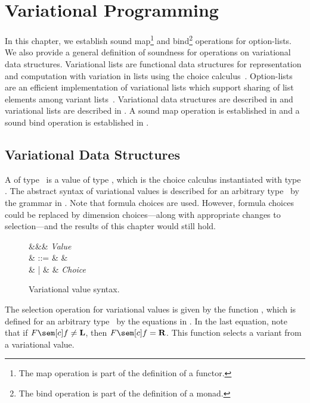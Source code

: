 \chapter{Variational Programming}
\label{ch:vp}

In this chapter, we establish sound map\footnote{The map operation is part of the definition of a functor.} and bind\footnote{The bind operation is part of the definition of a monad.} operations for option-lists.
We also provide a general definition of soundness for operations on variational data structures.
Variational lists are functional data structures for representation and computation with variation in lists using the choice calculus~\citep{WE12gpce}.
Option-lists are an efficient implementation of variational lists which support sharing of list elements among variant lists~\citep{Walk14onward}.
Variational data structures are described in  and variational lists are described in .
A sound map operation is established in  and a sound bind operation is established in .

\section{Variational Data Structures}
\label{sec:var}

A  of type \Val\ is a value of type \Var[\Val], which is the choice calculus instantiated with type \Val.
The abstract syntax of variational values is described for an arbitrary type \Val\ by the grammar in .
Note that formula choices are used.
However, formula choices could be replaced by dimension choices---along with appropriate changes to selection---and the results of this chapter would still hold.

\begin{figure}[H]
  \onehalfspacing
  \begin{syntax}
    \val \in \Val &&& \textit{Value} \\
    \var \in \Var[\Val]
    & ::= & \val & \\
    & | & \chc{\var, \var} & \textit{Choice}
  \end{syntax}
  \caption{Variational value syntax.}
  \label{fig:varsyn}
\end{figure}

The selection operation for variational values is given by the function \sel, which is defined for an arbitrary type \Val\ by the equations in .
In the last equation, note that if $\fSem[\cE]{\fE} \ne \tagL$, then $\fSem[\cE]{\fE} = \tagR$.
This function selects a variant from a variational value.

